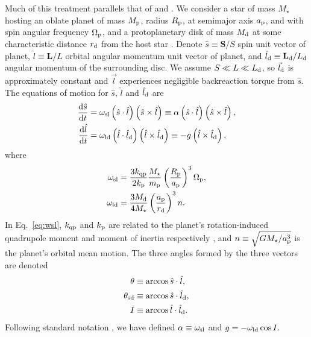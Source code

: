\documentclass[
        fleqn,
        usenatbib,
        referee,
    ]{mnras}
\newcommand*{\rd}[2]{\frac{\mathrm{d}#1}{\mathrm{d}#2}}
\newcommand*{\bm}[1]{\boldsymbol{\mathbf{#1}}}
\newcommand*{\p}[1]{\left(#1\right)}
\begin{document}
Much of this treatment parallels that of \citet{anderson2018teeter} and
\citet{millholland_disk}. We consider a star of mass $M_\star$ hosting an oblate
planet of mass $M_{\rm p}$, radius $R_{\rm p}$, at semimajor axis $a_{\rm p}$,
and with spin angular frequency $\Omega_{\rm p}$, and a protoplanetary disk of
mass $M_{\rm d}$ at some characteristic distance $r_{\rm d}$ from the host star
\citep[see][for a power-law disk profile]{millholland_disk}. Denote $\hat{s}
\equiv \bm{S} / S$ spin unit vector of planet, $\hat{l} \equiv \bm{L} / L$
orbital angular momentum unit vector of planet, and $\hat{l}_{\rm d} \equiv
\bm{L}_{\rm d} / L_{\rm d}$ angular momentum of the surrounding disc. We
assume $S \ll L \ll L_{\rm d}$, so $\vec{l}_{\rm d}$ is approximately
constant and $\vec{l}$ experiences negligible backreaction torque from
$\hat{s}$. The equations of motion for $\hat{s}$, $\hat{l}$ and $\hat{l}_{\rm
d}$ are
\begin{align}
    \rd{\hat{s}}{t} &= \omega_{\rm sl} \p{\hat{s} \cdot \hat{l}}
            \p{\hat{s} \times \hat{l}}
        \equiv \alpha \p{\hat{s} \cdot \hat{l}}
            \p{\hat{s} \times \hat{l}},\label{eq:dsdt}\\
    \rd{\hat{l}}{t} &= \omega_{\rm ld}\p{\hat{l} \cdot \hat{l}_{\rm d}}
            \p{\hat{l} \times \hat{l}_{\rm d}}
        \equiv -g\p{\hat{l} \times \hat{l}_{\rm d}},
            \label{eq:dldt}
\end{align}
where
\begin{align}
    \omega_{\rm sl} &= \frac{3k_{\rm qp}}{2k_{\rm p}} \frac{M_\star}{m_{\rm
        p}} \p{\frac{R_{\rm p}}{a_{\rm p}}}^3 \Omega_{\rm p},\label{eq:wsl}\\
    \omega_{\rm ld} &= \frac{3M_{\rm d}}{4M_\star}\p{\frac{a_{\rm
        p}}{r_{\rm d}}}^3 n .\label{eq:wld}
\end{align}
In Eq.~\eqref{eq:wsl}, $k_{\rm qp}$ and $k_{\rm p}$ are related to the planet's
rotation-induced quadrupole moment and moment of inertia respectively
\citep[see][]{lai2018}, and $n \equiv \sqrt{GM_\star/a_{\rm p}^3}$ is the
planet's orbital mean motion. The three angles formed by the three vectors are
denoted
\begin{align}
    \theta &\equiv \arccos \hat{s} \cdot \hat{l},\\
    \theta_{\rm sd} &\equiv \arccos \hat{s} \cdot \hat{l}_{\rm d},\\
    I &\equiv \arccos \hat{l} \cdot \hat{l}_{\rm d}.
\end{align}
Following standard notation \citep[e.g.][]{colombo1966,peale1969,ward_jupiter},
we have defined $\alpha \equiv \omega_{\rm sl}$ and $g = -\omega_{\rm ld}\cos
I$.
\end{document}

